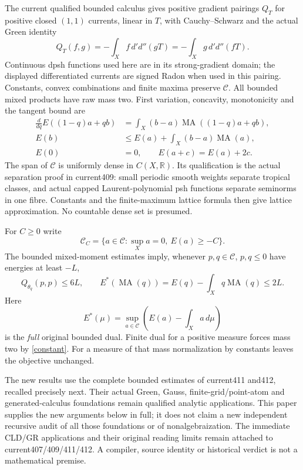 \documentclass[11pt]{article}
\newcommand{\C}{\mathcal C}
\newcommand{\MA}{\operatorname{MA}}
\newcommand{\DD}{d'd''}
\newcommand{\R}{\mathbb R}
\begin{document}
The current qualified bounded calculus gives positive gradient
pairings $Q_T$ for positive closed $(1,1)$ currents, linear in $T$,
with Cauchy--Schwarz and the actual Green identity
\begin{equation}\label{green}
 Q_T(f,g)=-\int_X f\,\DD(gT)
         =-\int_X g\,\DD(fT).
\end{equation}
Continuous dpsh functions used here are in its strong-gradient domain;
the displayed differentiated currents are signed Radon when used in
this pairing. Constants, convex combinations and finite maxima
preserve $\C$. All bounded mixed products have raw mass two.
First variation, concavity, monotonicity and the tangent bound are
\begin{align}
 \frac{d}{dq}E((1-q)a+qb)&=\int_X(b-a)\MA((1-q)a+qb),\label{variation}\\
 E(b)&\le E(a)+\int_X(b-a)\MA(a),\label{tangent}\\
 E(0)&=0,\qquad E(a+c)=E(a)+2c.\label{constant}
\end{align}
The span of $\C$ is uniformly dense in $C(X,\R)$. Its qualification
is the actual separation proof in current409: small periodic smooth
weights separate tropical classes, and actual capped Laurent-polynomial
psh functions separate seminorms in one fibre. Constants and the
finite-maximum lattice formula then give lattice approximation.
No countable dense set is presumed.

For $C\ge0$ write
\[
 \C_C=\{a\in\C:\sup_Xa=0,\ E(a)\ge-C\}.
\]
The bounded mixed-moment estimates imply, whenever $p,q\in\C$, $p,q\le0$
have energies at least $-L$,
\begin{equation}\label{gradient}
 Q_{\theta_q}(p,p)\le6L,\qquad
 E^*(\MA(q))=E(q)-\int_Xq\MA(q)\le2L.
\end{equation}
Here
\[
 E^*(\mu)=\sup_{a\in\C}\left(E(a)-\int_Xa\,d\mu\right)
\]
is the \emph{full} original bounded dual. Finite dual for a positive
measure forces mass two by \eqref{constant}. For a measure of that
mass normalization by constants leaves the objective unchanged.

The new results use the complete bounded estimates of current411
and412, recalled precisely next. Their actual Green, Gauss,
finite-grid/point-atom and generated-calculus foundations remain
qualified analytic applications. This paper supplies the new
arguments below in full; it does not claim a new independent
recursive audit of all those foundations or of nonalgebraization.
The immediate CLD/GR applications and their original reading limits
remain attached to current407/409/411/412. A compiler, source identity
or historical verdict is not a mathematical premise.
\end{document}
